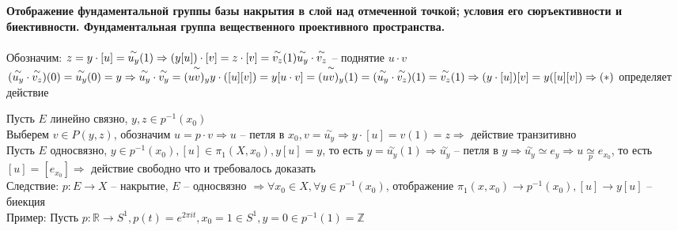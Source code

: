 \section{}
	\textbf{Отображение фундаментальной группы базы накрытия в слой над отмеченной точкой; условия его сюръективности и биективности. Фундаментальная группа вещественного проективного пространства.
}\\
	\\	
	Обозначим: $z = y\cdot [u] = \overset{\sim}{u_y} (1) \Rightarrow (y [u]) \cdot [v] = z \cdot [v] = \overset{\sim}{v_z} (1)\\
	\overset{\sim}{u_y} \cdot \overset{\sim}{v_z}$ -- поднятие $u\cdot v$\\
	$(\overset{\sim}{u_y} \cdot \overset{\sim}{v_z}) (0) = \overset{\sim}{u_y} (0) = y \Rightarrow \overset{\sim}{u_y} \cdot \overset{\sim}{v_y} = \overset{\sim}{(uv)_y}\\
	y\cdot ([u][v]) = y[u\cdot v] = \overset{\sim}{(uv)_y} (1) = (\overset{\sim}{u_y} \cdot \overset{\sim}{v_z}) (1) = \overset{\sim}{v_z} (1) \Rightarrow (y\cdot [u])[v] = y([u][v]) \Rightarrow (*)$ определяет действие\\
	\begin{comment}
	\begin{figure}[h]
	\center{\texttt{[image: 15-3.png]}}
	\end{figure}\\
	\end{comment}
	Пусть $E$ линейно связно, $y,z \in p^{-1} (x_0)$\\
	Выберем $v \in P(y,z)$, обозначим $u = p\cdot v \Rightarrow u$ -- петля в $x_0, v = \overset{\sim}{u_y} \Rightarrow y\cdot [u] = v(1) = z \Rightarrow$ действие транзитивно\\
	Пусть $E$ односвязно, $y\in p^{-1} (x_0), [u]\in {\pi}_1 (X,x_0), y[u] = y$, то есть $y = \overset{\sim}{u_y} (1) \Rightarrow \overset{\sim}{u_y}$ -- петля в $y \Rightarrow \overset{\sim}{u_y} \simeq e_y \Rightarrow u \underset{p}{\simeq} e_{x_0}$, то есть $[u] = [e_{x_0}] \Rightarrow$ действие свободно что и требовалось доказать\\
	Следствие: $p: E\rightarrow X$ -- накрытие, $E$ -- односвязно $\Rightarrow \forall x_0 \in X, \forall y\in p^{-1} (x_0)$, отображение ${\pi}_1 (x,x_0) \rightarrow p^{-1} (x_0), [u] \rightarrow y[u]$ -- биекция\\
	Пример: Пусть $p: \mathbb{R}
	\rightarrow S^1, p(t) = e^{2\pi it}, x_0 = 1 \in S^1, y = 0 \in p^{-1} (1) = \mathbb{Z}$\\
